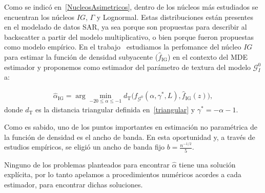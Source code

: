 
Como se indicó en~\ref{NucleosAsimetricos}, dentro de los núcleos más estudiados se encuentran los núcleos $IG$, $\Gamma$ y Lognormal. Estas distribuciones están presentes en el modelado de datos SAR, ya sea porque son propuestas para describir al backscatter a partir del modelo multiplicativo, o bien porque fueron propuestas como modelo empírico. En el trabajo~\cite{gambini2015} estudiamos la perfomance del núcleo $IG$ para estimar la función de densidad subyacente ($\widehat f_\text{IG}$) en el contexto del MDE estimador y proponemos como estimador del parámetro de textura del modelo $\mathcal{G}_I^0$ a:

\begin{align}
\widehat{\alpha}_{\text{IG}}= \arg\min_{-20\leq \alpha \leq -1} d_{\text{T}}\big(f_{\mathcal{G}^{0}}(\alpha,\gamma^*, L ), \widehat f_\text{IG}(z)\big),
\label{minimization}
\end{align}
donde $d_{\text{T}}$ es la distancia triangular definida en~\ref{triangular} y $\gamma^*=-\alpha-1$.  

Como es sabido, uno de los puntos importantes en estimación no paramétrica de la función de densidad es el ancho de banda. En esta oportunidad y, a través de estudios empíricos, se eligió un ancho de banda fijo $b=\frac{n^{-1/2}}{5}$.


Ninguno de los problemas planteados para encontrar $\widehat{\alpha}$ tiene una solución explícita, por lo tanto apelamos a procedimientos numéricos acordes a cada estimador, para encontrar dichas soluciones. 

